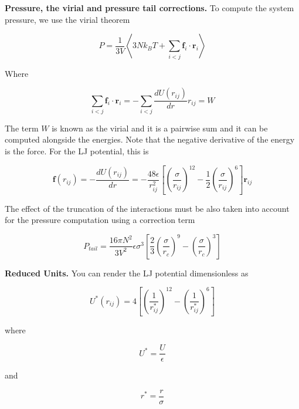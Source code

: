 \documentclass[aip,jcp,preprint,superscriptaddress,floatfix]{revtex4-1}
\begin{document}
\textbf{Pressure, the virial and pressure tail corrections.} To compute the system pressure, 
we use the virial theorem

\begin{equation}
	P = \frac{1}{3V} \left< 3 N k_B T + \sum_{i < j} \textbf{f}_i \cdot \textbf{r}_i  \right>
\end{equation}

Where 

\begin{equation}
	\sum_{i < j} \textbf{f}_i \cdot \textbf{r}_i = - \sum_{i < j} \frac{dU\left(r_{ij} \right)}{dr} r_{ij} = W
\end{equation}

The term $W$ is known as the virial and it is a pairwise sum and it can be computed 
alongside the energies. Note that the negative derivative of the energy is the force. 
For the LJ potential, this is

\begin{equation}
	\mathbf{f}\left(r_{ij} \right) = -\frac{dU \left(r_{ij} \right)}{dr} = - \frac{48 \epsilon}{r^2_{ij}} \left[\left(\frac{\sigma}{r_{ij}}\right)^{12} -\frac{1}{2}\left(\frac{\sigma}{r_{ij}}\right)^{6} \right] \mathbf{r}_{ij}
\end{equation}

The effect of the truncation of the interactions must be also taken into account for the pressure
computation using a correction term

\begin{equation}
	P_{tail} = \frac{16 \pi N^2}{3 V^2} \epsilon \sigma^3
	\left[\frac{2}{3} \left(\frac{\sigma}{r_c} \right)^9 
	- \left(\frac{\sigma}{r_c} \right)^3 \right]
\end{equation}

\textbf{Reduced Units.} You can render the LJ potential dimensionless as

\begin{equation}
	U^*\left(r_{ij} \right) = 4 \left[\left(\frac{1}{r^*_{ij}}\right)^{12} -\left(\frac{1}{r^*_{ij}}\right)^{6} \right]
\end{equation}

where 

\begin{equation}
	U^* = \frac{U}{\epsilon}
\end{equation}

and 

\begin{equation}
	r^* = \frac{r}{\sigma}
\end{equation}
\end{document}
